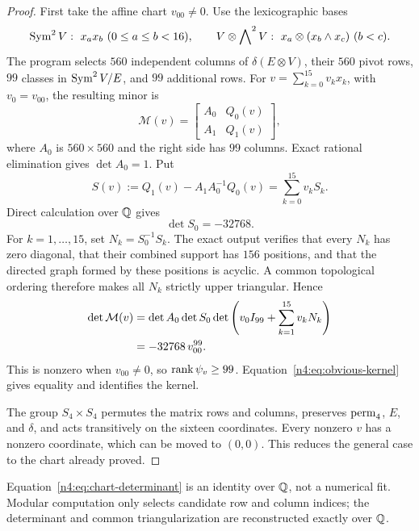 \begin{proof}
First take the affine chart \(v_{00}\neq0\). Use the lexicographic bases
\[
  \Sym^2V:\ x_ax_b\ (0\leq a\leq b<16),\qquad
  V\otimes\bigwedge\nolimits^2V:\
  x_a\otimes(x_b\wedge x_c)\ (b<c).
\]
The program selects \(560\) independent columns of
\(\delta(E\otimes V)\), their \(560\) pivot rows, \(99\) classes in
\(\operatorname{Sym}^2V/E\), and \(99\) additional rows. For
\(v=\sum_{k=0}^{15}v_kx_k\), with \(v_0=v_{00}\), the resulting minor is
\begin{equation}\label{n4:eq:659}
  \mathcal M(v)=
  \begin{bmatrix}A_0&Q_0(v)\\A_1&Q_1(v)\end{bmatrix},
\end{equation}
where \(A_0\) is \(560\times560\) and the right side has \(99\) columns.
Exact rational elimination gives \(\det A_0=1\). Put
\[
  S(v):=Q_1(v)-A_1A_0^{-1}Q_0(v)=\sum_{k=0}^{15}v_kS_k.
\]
Direct calculation over \(\mathbb Q\) gives
\begin{equation}\label{n4:eq:S0}
  \det S_0=-32768.
\end{equation}
For \(k=1,\ldots,15\), set \(N_k=S_0^{-1}S_k\). The exact output verifies
that every \(N_k\) has zero diagonal, that their combined support has \(156\)
positions, and that the directed graph formed by these positions is acyclic.
A common topological ordering therefore makes all \(N_k\) strictly upper
triangular. Hence
\begin{align}
  \det\mathcal M(v)
  &=\det A_0\det S_0
    \det\left(v_0I_{99}+\sum_{k=1}^{15}v_kN_k\right)\notag\\
  &=-32768\,v_{00}^{99}.\label{n4:eq:chart-determinant}
\end{align}
This is nonzero when \(v_{00}\neq0\), so \(\operatorname{rank}\psi_v\geq99\).
Equation~\eqref{n4:eq:obvious-kernel} gives equality and identifies the kernel.

The group \(S_4\times S_4\) permutes the matrix rows and columns, preserves
\(\operatorname{perm}_4\), \(E\), and \(\delta\), and acts transitively on the sixteen
coordinates. Every nonzero \(v\) has a nonzero coordinate, which can be moved
to \((0,0)\). This reduces the general case to the chart already proved.
\end{proof}

\begin{remark}
Equation~\eqref{n4:eq:chart-determinant} is an identity over \(\mathbb Q\), not a
numerical fit. Modular computation only selects candidate row and column
indices; the determinant and common triangularization are reconstructed
exactly over \(\mathbb Q\).
\end{remark}

